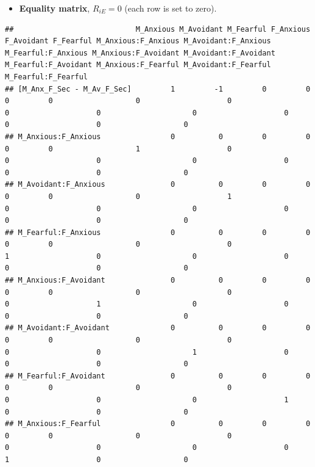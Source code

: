 \documentclass[
]{book}
\providecommand{\tightlist}{%
  \setlength{\itemsep}{0pt}\setlength{\parskip}{0pt}}
\begin{document}
\begin{itemize}
\tightlist
\item
  \textbf{Equality matrix}, \(R_{iE} = 0\) (each row is set to zero).
\end{itemize}

\begin{verbatim}
##                            M_Anxious M_Avoidant M_Fearful F_Anxious F_Avoidant F_Fearful M_Anxious:F_Anxious M_Avoidant:F_Anxious M_Fearful:F_Anxious M_Anxious:F_Avoidant M_Avoidant:F_Avoidant M_Fearful:F_Avoidant M_Anxious:F_Fearful M_Avoidant:F_Fearful M_Fearful:F_Fearful
## [M_Anx_F_Sec - M_Av_F_Sec]         1         -1         0         0          0         0                   0                    0                   0                    0                     0                    0                   0                    0                   0
## M_Anxious:F_Anxious                0          0         0         0          0         0                   1                    0                   0                    0                     0                    0                   0                    0                   0
## M_Avoidant:F_Anxious               0          0         0         0          0         0                   0                    1                   0                    0                     0                    0                   0                    0                   0
## M_Fearful:F_Anxious                0          0         0         0          0         0                   0                    0                   1                    0                     0                    0                   0                    0                   0
## M_Anxious:F_Avoidant               0          0         0         0          0         0                   0                    0                   0                    1                     0                    0                   0                    0                   0
## M_Avoidant:F_Avoidant              0          0         0         0          0         0                   0                    0                   0                    0                     1                    0                   0                    0                   0
## M_Fearful:F_Avoidant               0          0         0         0          0         0                   0                    0                   0                    0                     0                    1                   0                    0                   0
## M_Anxious:F_Fearful                0          0         0         0          0         0                   0                    0                   0                    0                     0                    0                   1                    0                   0

\end{verbatim}
\end{document}

